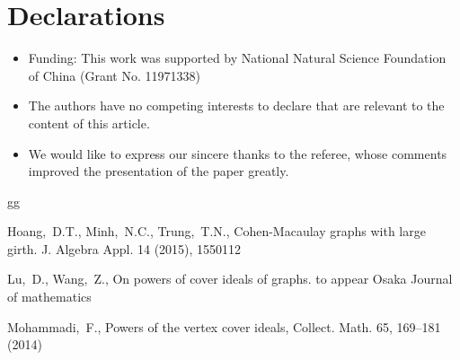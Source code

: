 \documentclass[sn-mathphys,Numbered]{sn-jnl}%
\theoremstyle{thmstyleone}%
\theoremstyle{thmstyletwo}%
\theoremstyle{thmstylethree}%
\begin{document}
\section*{Declarations}

\begin{itemize}
\item Funding: This work was supported by National Natural Science Foundation of China  (Grant No. 11971338)
\item The authors have no competing interests to declare that are relevant to the content of this article.

\item We would like to express our sincere thanks to  the referee, whose comments improved the presentation of the paper greatly.
\end{itemize}



\begin{thebibliography}{gg}



 Hoang,~D.T., Minh,~N.C., Trung,~T.N., Cohen-Macaulay graphs with large girth. J. Algebra Appl. 14 (2015),   1550112

  Lu,~D., Wang,~Z., On  powers of  cover ideals of  graphs. to appear Osaka Journal of mathematics

  Mohammadi,~F., Powers of the vertex cover ideals, Collect. Math. 65, 169--181 (2014)


\end{thebibliography}
\end{document}
